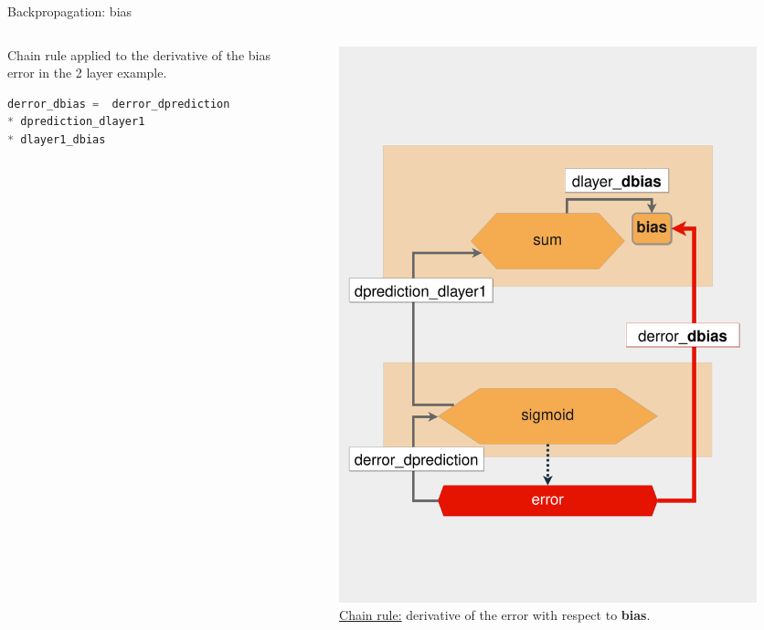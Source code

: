 \documentclass{beamer}
\begin{document}
\begin{frame}[fragile]{Backpropagation: bias}
    \begin{columns}
        \begin{column}{0.6\linewidth}  
            Chain rule applied to the derivative of the bias error in the 2 layer example.   
            \begin{lstlisting}[language=Python]
derror_dbias =  derror_dprediction 
* dprediction_dlayer1 
* dlayer1_dbias
            \end{lstlisting}
        \end{column}
        \begin{column}{0.4\linewidth}
            \begin{figure}
                \includegraphics[width=0.9\linewidth]{BiasGradient}
                \caption{\href{https://realpython.com/python-ai-neural-network/}{Chain rule:}  derivative of the error with respect to {\bf bias}.}
                \label{Fig:Training2Layer}
            \end{figure}
        \end{column}
     \end{columns}
\end{frame}
\end{document}
